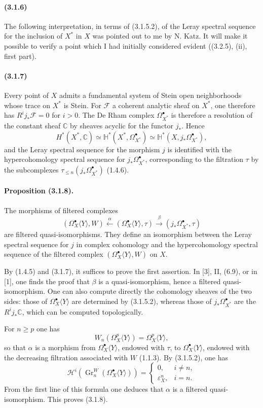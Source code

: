 \documentclass[10pt]{article}
\newcommand{\C}{\mathbb C}
\newcommand{\Gr}{\operatorname{Gr}}
\begin{document}
\paragraph{(3.1.6)} The following interpretation, in terms of (3.1.5.2), of the Leray spectral sequence for the inclusion of $X^*$ in $X$ was pointed out to me by N. Katz. It will make it possible to verify a point which I had initially considered evident ((3.2.5), (ii), first part).

\paragraph{(3.1.7)} Every point of $X$ admits a fundamental system of Stein open neighborhoods whose trace on $X^*$ is Stein. For $\mathcal F$ a coherent analytic sheaf on $X^*$, one therefore has $R^ij_*\mathcal F=0$ for $i>0$. The De Rham complex $\Omega_{X^*}^\bullet$ is therefore a resolution of the constant sheaf $\C$ by sheaves acyclic for the functor $j_*$. Hence
\[
\tag{3.1.7.1}
H^*(X^*,\C)\simeq\mathbb H^*(X^*,\Omega_{X^*}^\bullet)
\simeq\mathbb H^*(X,j_*\Omega_{X^*}^\bullet),
\]
and the Leray spectral sequence for the morphism $j$ is identified with the hypercohomology spectral sequence for $j_*\Omega_{X^*}^\bullet$, corresponding to the filtration $\tau$ by the subcomplexes $\tau_{\le n}(j_*\Omega_{X^*}^\bullet)$ (1.4.6).

\paragraph{Proposition (3.1.8).} The morphisms of filtered complexes
\[
(\Omega_X^\bullet\langle Y\rangle,W)
\xleftarrow{\ \alpha\ }
(\Omega_X^\bullet\langle Y\rangle,\tau)
\xrightarrow{\ \beta\ }
(j_*\Omega_{X^*}^\bullet,\tau)
\]
are filtered quasi-isomorphisms. They define an isomorphism between the Leray spectral sequence for $j$ in complex cohomology and the hypercohomology spectral sequence of the filtered complex $(\Omega_X^\bullet\langle Y\rangle,W)$ on $X$.

By (1.4.5) and (3.1.7), it suffices to prove the first assertion. In [3], II, (6.9), or in [1], one finds the proof that $\beta$ is a quasi-isomorphism, hence a filtered quasi-isomorphism. One can also compute directly the cohomology sheaves of the two sides: those of $\Omega_X^\bullet\langle Y\rangle$ are determined by (3.1.5.2), whereas those of $j_*\Omega_{X^*}^\bullet$ are the $R^ij_*\C$, which can be computed topologically.

For $n\ge p$ one has
\[
W_n(\Omega_X^p\langle Y\rangle)=\Omega_X^p\langle Y\rangle,
\]
so that $\alpha$ is a morphism from $\Omega_X^\bullet\langle Y\rangle$, endowed with $\tau$, to $\Omega_X^\bullet\langle Y\rangle$, endowed with the decreasing filtration associated with $W$ (1.1.3). By (3.1.5.2), one has
\[
\tag{3.1.8.1}
\mathcal H^i(\Gr_n^W(\Omega_X^\bullet\langle Y\rangle))=
\begin{cases}
0,& i\ne n,\\
\varepsilon_X^n,& i=n.
\end{cases}
\]
From the first line of this formula one deduces that $\alpha$ is a filtered quasi-isomorphism. This proves (3.1.8).
\end{document}
